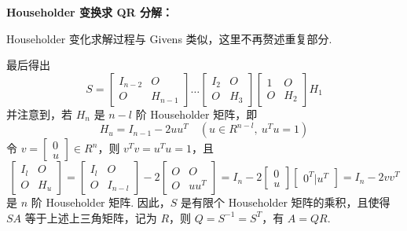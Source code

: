             \par \textbf{Householder 变换求 QR 分解：}
            \par Householder 变化求解过程与 Givens 类似，这里不再赘述重复部分.
            \par 最后得出 
            \begin{equation*}
                S = \begin{bmatrix}
                    I_{n-2} & O \\ O & H_{n-1} 
                \end{bmatrix} \dots \begin{bmatrix}
                    I_2 & O \\ O & H_3
                \end{bmatrix} \begin{bmatrix}
                    1 & O \\ O & H_2
                \end{bmatrix} H_1
            \end{equation*}
            并注意到，若 $H_n$ 是 $n-l$ 阶 Householder 矩阵，即
            \begin{equation*}
                H_u = I_{n-1} - 2uu^T \quad (u \in R^{n-l}, \ u^Tu = 1)
            \end{equation*}
            令 $v = \begin{bmatrix} 0 \\ u \end{bmatrix} \in R^n$，则 $v^Tv = u^Tu = 1$，且
            \begin{equation*}
                \begin{bmatrix}
                    I_l & O \\ O & H_u 
                \end{bmatrix} = \begin{bmatrix}
                    I_l & O \\ O & I_{n-l}
                \end{bmatrix} - 2\begin{bmatrix}
                    O & O \\ O & uu^T
                \end{bmatrix} = I_n - 2\begin{bmatrix}
                    0 \\ u
                \end{bmatrix}\begin{bmatrix}
                    0^T | u^T
                \end{bmatrix} = I_n - 2vv^T
            \end{equation*}
            是 $n$ 阶 Householder 矩阵. 因此，$S$ 是有限个 Householder 矩阵的乘积，且使得 $SA$ 等于上述上三角矩阵，记为 $R$，则 $Q = S^{-1} = S^T$，有 $A = QR$.
